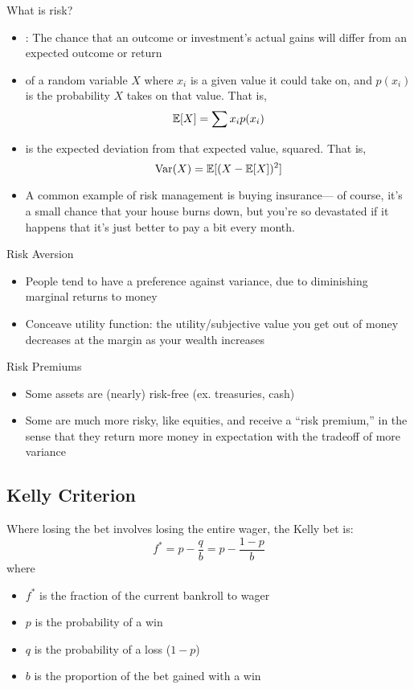 
What is risk?
\begin{itemize}
    \item {}: The chance that an outcome or investment's actual gains will differ from an expected outcome or return
\item {} of a random variable $ X $ where $ x_{i} $ is a given value it could take on, and $ p(x_{i}) $ is the probability $ X $ takes on that value. That is,
        \begin{equation*}
            \mathbb{E}[X] = \sum x_{i} p(x_{i})
        \end{equation*}
    \item {} is the expected deviation from that expected value, squared. That is,
        \begin{equation*}
            \operatorname{Var}(X) = \mathbb{E}[(X - \mathbb{E}[X])^2]
        \end{equation*}
    \item A common example of risk management is buying insurance— of course, it's a small chance that your house burns down, but you're so devastated if it happens that it's just better to pay a bit every month.
\end{itemize}

Risk Aversion
\begin{itemize}
    \item People tend to have a preference against variance, due to diminishing marginal returns to money
    \item Conceave utility function: the utility/subjective value you get out of money decreases at the margin as your wealth increases
\end{itemize}

Risk Premiums
\begin{itemize}
    \item Some assets are (nearly) risk-free (ex. treasuries, cash)
    \item Some are much more risky, like equities, and receive a ``risk premium,'' in the sense that they return more money in expectation with the tradeoff of more variance
\end{itemize}

\subsection{Kelly Criterion}
Where losing the bet involves losing the entire wager, the Kelly bet is:
\begin{equation*}
    f^* = p - \frac{q}{b} = p - \frac{1-p}{b}
\end{equation*}
where
\begin{itemize}
    \item $ f^* $ is the fraction of the current bankroll to wager
    \item $ p $ is the probability of a win
    \item $ q $ is the probability of a loss ($ 1-p $)
    \item $ b $ is the proportion of the bet gained with a win
\end{itemize}

